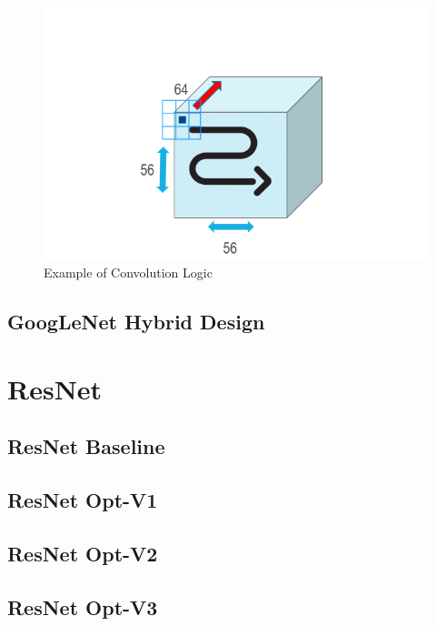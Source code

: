 \begin{figure}[!htb]
  \includegraphics[width=\textwidth,height=\textheight,keepaspectratio]{img/GoogLeNet_Conv_logic.png}
  \caption{Example of Convolution Logic}
  \label{fig:GoogLeNet_Conv_logic}
\end{figure}


























\subsection{GoogLeNet Hybrid Design}

\section{ResNet}
\subsection{ResNet Baseline}
\subsection{ResNet Opt-V1}
\subsection{ResNet Opt-V2}
\subsection{ResNet Opt-V3}
